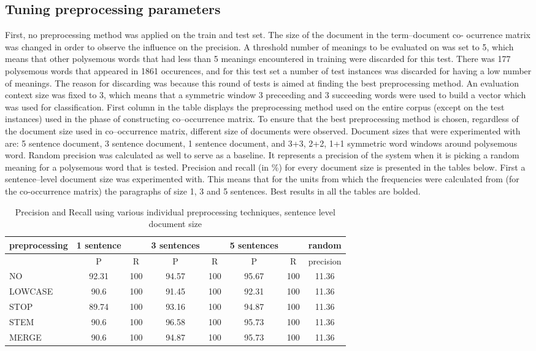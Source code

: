 \subsection{Tuning preprocessing parameters}
First, no preprocessing method was applied on the train and test set. The size of the document in the term--document co-
ocurrence matrix was changed in order to observe the influence on the precision. A threshold number of meanings to be evaluated on was set to 5, which means that other polysemous words that had less than 5 meanings encountered in training were discarded for this test. There was 177 polysemous words that appeared in 1861 occurences, and for this test set a number of test instances was discarded for having a 
low number of meanings. The reason for discarding was because this round of tests is aimed at finding the best preprocessing method. 
 An evaluation context size was fixed to 3, which means that a symmetric window 3 preceeding and 3 succeeding words were used to build a vector which was used for classification. First column in the table displays the preprocessing method used on the entire corpus (except on the test instances) used in the phase of constructing co--occurrence matrix. To ensure that the best preprocessing method is chosen, regardless of the 
document size used in co--occurrence matrix, different size of documents were observed. Document sizes that were
experimented with are: 5 sentence document, 3 sentence document, 1 sentence document, and 3+3, 2+2, 1+1 symmetric word windows around polysemous word.  
Random precision was calculated as well to serve as a baseline. It represents a precision of the system when it is picking a random meaning for a polysemous word that is tested. 
Precision and recall (in \%) for every document size is presented in the tables below. First a sentence--level 
document size was experimented with. This means that for the units from which the frequencies were calculated from (for the co-occurrence matrix) the paragraphs of size 1, 3 and 5 sentences. 
Best results in all the tables are bolded. 

\begin{table}[h!]
\begin{tabular}{ l | c c | c c | c c | c}
   preprocessing &  1 sentence && 3 sentences && 5 sentences  && random\\
\hline
	& P  &  R & P  &  R & P  &  R & precision\\
\hline\hline
 NO  & 92.31 & 100 & 94.57 & 100 & 95.67 & 100  &11.36 \\
LOWCASE  & 90.6 & 100 & 91.45 & 100 & 92.31 & 100 & 11.36 \\
STOP  & 89.74 & 100 & 93.16 & 100 & 94.87 & 100 & 11.36 \\
 STEM  & 90.6 & 100 & 96.58 & 100 & 95.73 & 100 & 11.36 \\
 MERGE  & 90.6 & 100 & 94.87 & 100 & 95.73 & 100 & 11.36 \\
\end{tabular}
\caption{Precision and Recall using various individual preprocessing techniques, sentence level document size}
\end{table}

